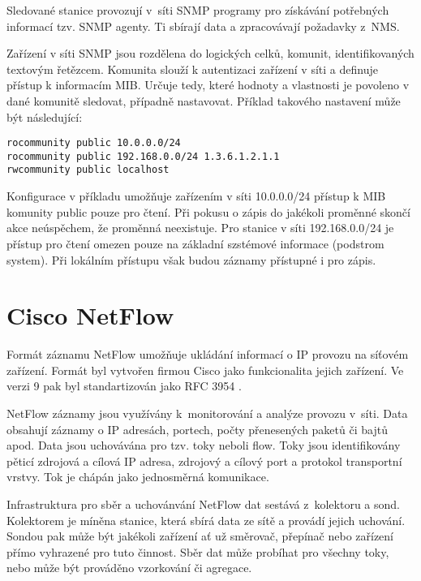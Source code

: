 Sledované stanice provozují v~síti SNMP programy pro získávání potřebných informací tzv. SNMP agenty.
 Ti sbírají data a zpracovávají požadavky z~NMS.

Zařízení v síti SNMP jsou rozdělena do logických celků, komunit, identifikovaných textovým
 řetězcem. Komunita slouží k autentizaci zařízení v síti a definuje přístup k informacím MIB.
 Určuje tedy, které hodnoty a vlastnosti je povoleno v dané komunitě sledovat, případně nastavovat.
 Příklad takového nastavení může být následující: 
\begin{verbatim}
rocommunity public 10.0.0.0/24
rocommunity public 192.168.0.0/24 1.3.6.1.2.1.1
rwcommunity public localhost
\end{verbatim}
Konfigurace v příkladu umožňuje zařízením v síti 10.0.0.0/24 přístup k MIB komunity public pouze
 pro čtení. Při pokusu o zápis do jakékoli proměnné skončí akce neúspěchem, že proměnná neexistuje.
 Pro stanice v síti 192.168.0.0/24 je přístup pro čtení omezen pouze na základní szstémové informace
 (podstrom system). Při lokálním přístupu však budou záznamy přístupné i pro zápis.

\section{Cisco NetFlow}
\label{netflow}

Formát záznamu NetFlow umožňuje ukládání informací o IP provozu na síťovém zařízení. Formát byl
 vytvořen firmou Cisco jako funkcionalita jejich zařízení. Ve verzi 9 pak byl standartizován
 jako RFC 3954 \cite{rfc3954}.

NetFlow záznamy jsou využívány k~monitorování a analýze provozu v~síti. Data obsahují záznamy
 o IP adresách, portech, počty přenesených paketů či bajtů apod. Data jsou uchovávána pro
 tzv. toky neboli flow. Toky jsou identifikovány pěticí zdrojová a cílová IP adresa,
 zdrojový a cílový port a protokol transportní vrstvy. Tok je chápán jako jednosměrná komunikace.

Infrastruktura pro sběr a uchovánvání NetFlow dat sestává z~kolektoru a sond. Kolektorem je míněna
 stanice, která sbírá data ze sítě a provádí jejich uchování. Sondou pak může být jakékoli zařízení
 ať už směrovač, přepínač nebo zařízení přímo vyhrazené pro tuto činnost. Sběr dat může probíhat
 pro všechny toky, nebo může být prováděno vzorkování či agregace. 

